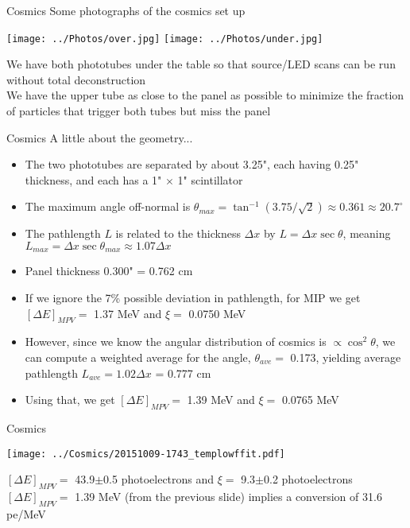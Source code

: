 \documentclass[compress,8pt]{beamer} %
\begin{document}
\begin{frame}{Cosmics}
Some photographs of the cosmics set up
\begin{adjustwidth}{-2em}{-2em}
\begin{center}
\texttt{[image: ../Photos/over.jpg]}
\texttt{[image: ../Photos/under.jpg]}
\end{center}
\end{adjustwidth}
We have both phototubes under the table so that source/LED scans can be run without total deconstruction \\
We have the upper tube as close to the panel as possible to minimize the fraction of particles that
trigger both tubes but miss the panel
\end{frame}



\begin{frame}{Cosmics}
A little about the geometry...
\begin{itemize}
\item The two phototubes are separated by about 3.25", each having 0.25" thickness, and each has a 1" $\times$ 1" scintillator
\item The maximum angle off-normal is
$\theta_{max} = \tan^{-1}(3.75/\sqrt{2}) \approx 0.361 \approx 20.7^{\circ} $
\item The pathlength $L$ is related to the thickness $\Delta x$ by $L = \Delta x \sec \theta$,
meaning $L_{max} = \Delta x \sec \theta_{max} \approx 1.07\Delta x$
\item Panel thickness 0.300" = 0.762 cm
\item If we ignore the 7\% possible deviation in pathlength,
for MIP we get $[\Delta E]_{MPV} =$ 1.37 MeV and $\xi =$ 0.0750 MeV
\item However, since we know the angular distribution of cosmics is $\propto \cos^2\theta$,
we can compute a weighted average for the angle, $\theta_{ave} =$ 0.173, yielding average
pathlength $L_{ave} = 1.02 \Delta x$ = 0.777 cm
\item Using that, we get $[\Delta E]_{MPV} =$ 1.39 MeV and $\xi =$ 0.0765 MeV
\end{itemize}
\end{frame}



\begin{frame}{Cosmics}
\begin{adjustwidth}{-2em}{-2em}
\begin{center}
\texttt{[image: ../Cosmics/20151009-1743\_templowffit.pdf]}
\end{center}
\end{adjustwidth}
$[\Delta E]_{MPV} =$ 43.9$\pm$0.5 photoelectrons and $\xi =$ 9.3$\pm$0.2 photoelectrons \\
$[\Delta E]_{MPV} =$ 1.39 MeV (from the previous slide) implies a conversion of 31.6 pe/MeV
\end{frame}
\end{document}
